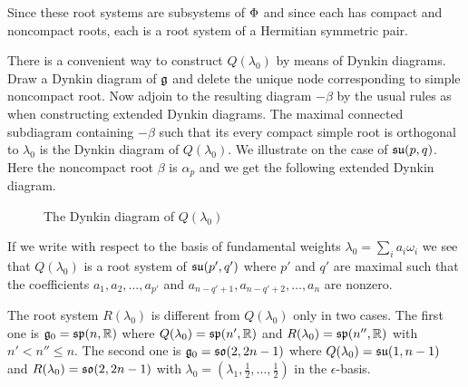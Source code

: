 Since these root systems are subsystems of $\Phi$ and since each has compact and noncompact roots, each is a root system of a Hermitian symmetric pair.

There is a convenient way to construct $Q(\lambda_0)$ by means of Dynkin diagrams. Draw a Dynkin diagram of $\mathfrak{g}$ and delete the unique node corresponding to simple noncompact root. Now adjoin to the resulting diagram $-\beta$ by the usual rules as when constructing extended Dynkin diagrams. The maximal connected subdiagram containing $-\beta$ such that its every compact simple root is orthogonal to $\lambda_0$ is the Dynkin diagram of $Q(\lambda_0)$. We illustrate on the case of $\mathfrak{su}(p,q)$. Here the noncompact root $\beta$ is $\alpha_p$ and we get the following extended Dynkin diagram.
\begin{figure}[h]\label{fig:Q}
  \begin{center}
  \end{center}\caption{The Dynkin diagram of $Q(\lambda_0)$} 
\end{figure}
If we write with respect to the basis of fundamental weights $\lambda_0 = \sum_i a_i \omega_i$ we see that $Q(\lambda_0)$ is a root system of $\mathfrak{su}(p',q')$ where $p'$ and $q'$ are maximal such that the coefficients $a_1,a_2,\ldots,a_{p'}$ and $a_{n-q'+1},a_{n-q'+2}, \ldots, a_n$ are nonzero.

The root system $R(\lambda_0)$ is different from $Q(\lambda_0)$ only in two cases. The first one is $\mathfrak{g}_0=\mathfrak{sp}(n,\mathbb{R})$ where $Q(\lambda_0) = \mathfrak{sp}(n',\mathbb{R})$ and $R(\lambda_0) = \mathfrak{sp}(n'',\mathbb{R})$ with $n' < n'' \leq n$. The second one is $\mathfrak{g}_0=\mathfrak{so}(2,2n-1)$ where $Q(\lambda_0) = \mathfrak{su}(1,n-1)$ and $R(\lambda_0) = \mathfrak{so}(2,2n-1)$ with $\lambda_0 = (\lambda_1,\frac{1}{2},\ldots,\frac{1}{2})$ in the $\epsilon$-basis.

